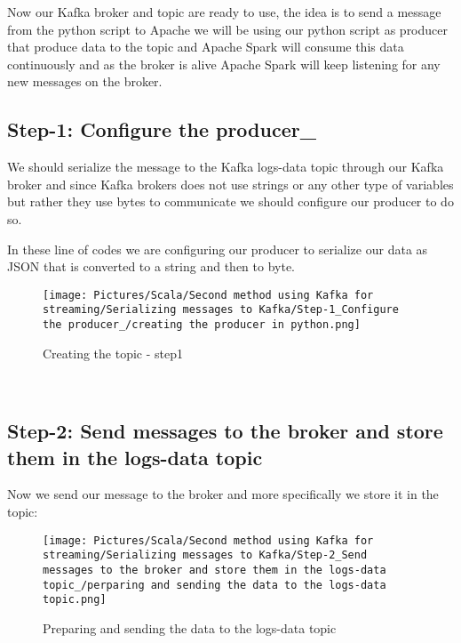 \begin{spacing}{1.2}
\par Now our Kafka broker and topic are ready to use, the idea is to send a message from the python script to Apache we will be using our python script as producer that produce data to the topic and Apache Spark will consume this data continuously and as the broker is alive Apache Spark will keep listening for any new messages on the broker.
\subsection{Step-1: Configure the producer_ }


\par We should serialize the message to the Kafka logs-data topic through our Kafka broker and since Kafka brokers does not use strings or any other type of variables but rather they use bytes to communicate we should configure our producer to do so.


\par In these line of codes we are configuring our producer to serialize our data as JSON that is converted to a string and then to byte.
\begin{figure}[!htb] 
\begin{center} 
\texttt{[image: Pictures/Scala/Second method using Kafka for streaming/Serializing messages to Kafka/Step-1\_Configure the producer\_/creating the producer in python.png]}
\end{center} 
\label{fig:broker-Kafka-1}
\caption{Creating the topic - step1} 
\end{figure}  \FloatBarrier
\\


\subsection{Step-2: Send messages to the broker and store them in the logs-data topic }
\par Now we send our message to the broker and more specifically we store it in the topic:
\\
\begin{figure}[!htb] 
\begin{center} 
\texttt{[image: Pictures/Scala/Second method using Kafka for streaming/Serializing messages to Kafka/Step-2\_Send messages to the broker and store them in the logs-data topic\_/perparing and sending the data to the logs-data topic.png]}
\end{center} 
\label{fig:broker-Kafka-1}
\caption{Preparing and sending the data to the logs-data topic} 
\end{figure}  \FloatBarrier
\\


\end{spacing}
